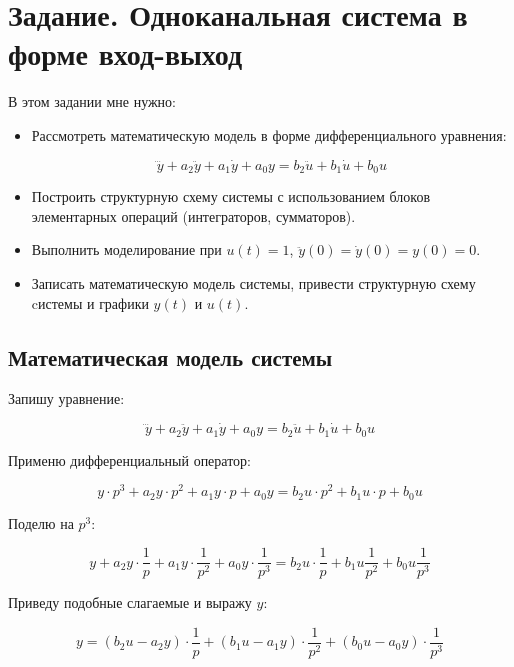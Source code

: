 \documentclass[a4paper,12pt]{article}
\begin{document}
	\newpage
	\tableofcontents
	\newpage
	
	\section{Задание. Одноканальная система в форме вход-выход}
	
	В этом задании мне нужно:
	
	\begin{itemize}
		
		\item Рассмотреть математическую модель в форме дифференциального уравнения: 
		
		\[\dddot{y} + a_2\ddot{y} + a_1\dot{y} + a_0y = b_2\ddot{u} + b_1\dot{u} + b_0u\]
		
		\item Построить структурную схему системы с использованием блоков элементарных операций (интеграторов, сумматоров).
		
		\item Выполнить моделирование при \(u(t) = 1\), \(\ddot{y}(0) = \dot{y}(0) = y(0) = 0\).
		
		\item Записать математическую модель системы, привести структурную схему cистемы и графики \(y(t)\) и \(u(t)\).
		
	\end{itemize}
	
	
	
	\subsection{Математическая модель системы}

	Запишу уравнение:
	
	\[\dddot{y} + a_2\ddot{y} + a_1\dot{y} + a_0y = b_2\ddot{u} + b_1\dot{u} + b_0u\]
	
	Применю дифференциальный оператор:
	
	\[y \cdot p^3 + a_2 y \cdot p^2+ a_1 y \cdot p + a_0 y = b_2 u \cdot p^2  + b_1 u \cdot p + b_0u\]
	
	Поделю на \(p^3\):
	
	\[y + a_2 y \cdot \frac{1}{p}  + a_1 y \cdot\frac{1}{p^2} + a_0 y \cdot \frac{1}{p^3} = b_2 u \cdot \frac{1}{p}  + b_1 u \frac{1}{p^2} + b_0u \frac{1}{p^3}\]
	
	Приведу подобные слагаемые и выражу \(y\):
	
	\[
		y = (b_2 u - a_2 y) \cdot \frac{1}{p} + (b_1 u - a_1 y) \cdot \frac{1}{p^2} + (b_0 u - a_0 y) \cdot \frac{1}{p^3} 
	\]
	
\end{document}

